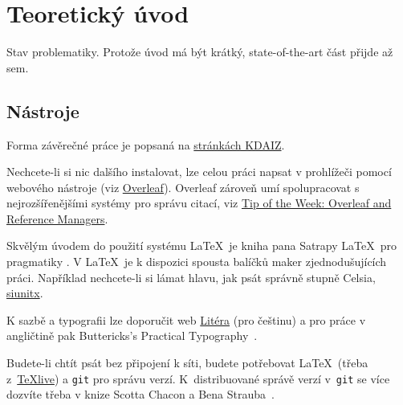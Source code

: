 \chapter{Teoretický úvod}
\label{sec:teorie}

\noindent Stav problematiky. Protože úvod má být krátký, state-of-the-art část přijde až sem.

\section{Nástroje}
\label{sec:nastroje}

Forma závěrečné práce je popsaná na   \href{https://kdaiz.fjfi.cvut.cz/informace/zaverecne-rocnikove-prace/prace-rt-rf.html}{stránkách KDAIZ}.

Nechcete-li si nic dalšího instalovat, lze celou práci napsat v prohlížeči pomocí webového nástroje (viz \href{https://overleaf.com}{Overleaf}). Overleaf zároveň umí spolupracovat s nejrozšířenějšími systémy pro správu citací, viz \href{https://www.overleaf.com/blog/639-tip-of-the-week-overleaf-and-reference-managers}{Tip of the Week: Overleaf and Reference Managers}.

Skvělým úvodem do použití systému \LaTeX\ je kniha pana Satrapy \LaTeX\ pro pragmatiky \cite{satrapa_latex_2011}.
V \LaTeX\ je k dispozici spousta balíčků maker zjednodušujících práci. Například nechcete-li si lámat hlavu, jak psát správně stupně Celsia,  \href{https://texdoc.org/serve/siunitx/0}{siunitx}.

K sazbě a typografii lze doporučit web \href{http://www.liteera.cz}{Litéra} (pro češtinu) a pro práce v angličtině pak Buttericks's Practical Typography~\cite{butterick_matthew_buttericks_nodate}.

Budete-li chtít psát bez připojení k síti, budete potřebovat \LaTeX\ (třeba z~\href{https://tug.org/texlive/}{TeXlive}) a \verb?git? pro správu verzí. K~distribuované správě verzí v~\verb?git? se více dozvíte třeba v knize Scotta Chacon a Bena Strauba~\cite{chacon_pro_2014}.

